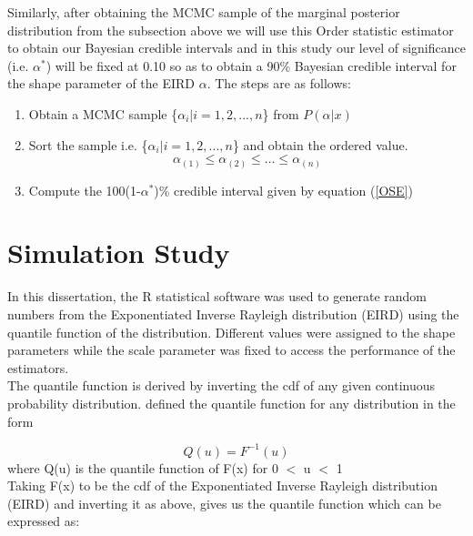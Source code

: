 \documentclass[a4paper,12pt]{report}
\newcommand{\para}{\hspace{0.5cm}}
\begin{document}
\noindent\para Similarly, after obtaining the MCMC sample of the marginal posterior distribution from the subsection above we will use this Order statistic estimator to obtain our Bayesian credible intervals and in this study our level of significance (i.e. $\alpha^*$) will be fixed at 0.10 so as to obtain a 90\% Bayesian credible interval for the shape parameter of the EIRD $\alpha$. The steps are as follows:
\begin{enumerate}
\item Obtain a MCMC sample \{$\alpha_i|i=1,2,...,n$\} from $P(\alpha|x)$
\item Sort the sample i.e. \{$\alpha_i|i=1,2,...,n$\} and obtain the ordered value.
\[\alpha_{(1)}\le\alpha_{(2)}\le . . .\le \alpha_{(n)}\]
\item Compute the 100(1-$\alpha^*$)\% credible interval given by equation (\ref{OSE})
\end{enumerate}
\section{Simulation Study}
\noindent\para In this dissertation, the R statistical software was used to generate random numbers from the Exponentiated Inverse Rayleigh distribution (EIRD) using the quantile function of the distribution. Different values were assigned to the shape parameters while the scale parameter was fixed to access the performance of the estimators.\\
The quantile function is derived by inverting the cdf of any given continuous probability distribution. \cite{Hyndman1996} defined the quantile function for any distribution in the form

\begin{equation}
Q(u) = F^{-1}(u)
\end{equation}  
where Q(u) is the quantile function of F(x) for  0 $<$ u $<$ 1\\

Taking F(x) to be the cdf of the Exponentiated Inverse Rayleigh distribution (EIRD) and inverting it as above, gives us the quantile function which can be expressed as:
\end{document}
